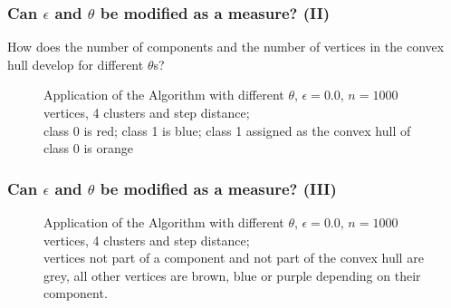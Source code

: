 \documentclass[
    11pt, %
    aspectratio=169, %
    handout
]{beamer}
\begin{document}
\begin{frame}
\frametitle{Can $\epsilon$ and $\theta$ be modified as a measure? (II)}
\begin{center}
{ How does the number of components and the number of vertices in the convex hull develop for different $\theta$s? }
\end{center}

\begin{figure}
\centering
{}
\hfill
{}
\hfill
{}
\caption{Application of the Algorithm with different $\theta$, $\epsilon=0.0$,  $n=1000$ vertices, 4 clusters  and step distance; \\ class 0 is red; class 1 is blue; class 1 assigned as the convex hull of class 0 is orange}
\end{figure}
\end{frame}

\begin{frame}
\frametitle{Can $\epsilon$ and $\theta$ be modified as a measure? (III)}
\begin{figure}
\centering
{}
\hfill
{}
\hfill
{}
\caption{Application of the Algorithm with different $\theta$, $\epsilon=0.0$,  $n=1000$ vertices, 4 clusters  and step distance; \\ vertices not part of a component and not part of the convex hull are grey, all other vertices are brown, blue or purple depending on their component.}
\end{figure}
\end{frame}
\end{document}
